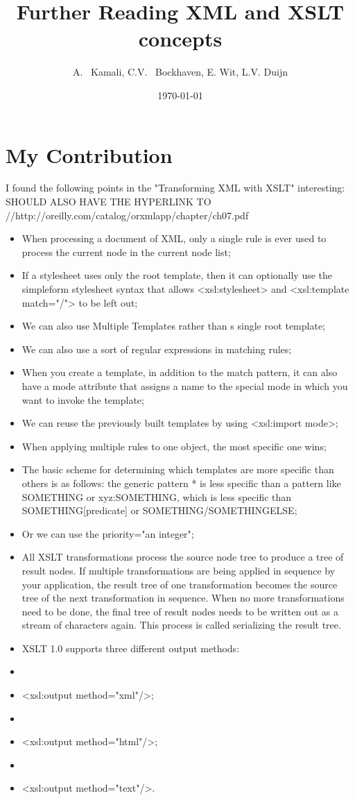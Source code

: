 \documentclass[titlepage; draft]{report}
\author{A. ~Kamali, C.V. ~Bockhaven, E. Wit, L.V. Duijn}
\title{Further Reading \newline XML and XSLT concepts}
\date{\today}
\begin{document}
        \maketitle
        \tableofcontents

\section{My Contribution}
	I found the following points in the "Transforming XML with XSLT" interesting:   SHOULD ALSO HAVE THE HYPERLINK TO //http://oreilly.com/catalog/orxmlapp/chapter/ch07.pdf
        \begin{itemize}
		\item When processing a document of XML, only a single rule is ever used to process the current node in the current node list;
		\item If a stylesheet uses only the root template, then it can optionally use the simpleform stylesheet syntax that allows <xsl:stylesheet> and <xsl:template match="/"> to be left out;
		\item We can also use Multiple Templates rather than s single root template;
		\item We can also use a sort of regular expressions in matching rules;
		\item When you create a template, in addition to the match pattern, it can also have a mode attribute that assigns a name to the special mode in which you want to invoke the template;
		\item We can reuse the previously built templates by using <xsl:import mode>;
		\item When applying multiple rules to one object, the most specific one wins;
		\item The basic scheme for determining which templates are more specific than others is as follows: the generic pattern * is less specific than a pattern like SOMETHING or xyz:SOMETHING, which is less specific than SOMETHING[predicate] or SOMETHING/SOMETHINGELSE;
		\item Or we can use the priority="an integer";
		\item All XSLT transformations process the source node tree to produce a tree of result nodes. If multiple transformations are being applied in sequence by your application, the result tree of one transformation becomes the source tree of the next transformation in sequence. When no more transformations need to be done, the final tree of result nodes needs to be written out as a stream of characters again. This process is called serializing the result tree.
		\item XSLT 1.0 supports three different output methods:
		\item \item <xsl:output method="xml"/>;
		\item \item <xsl:output method="html"/>;
		\item \item <xsl:output method="text"/>.
        \end{itemize}
\end{document}
